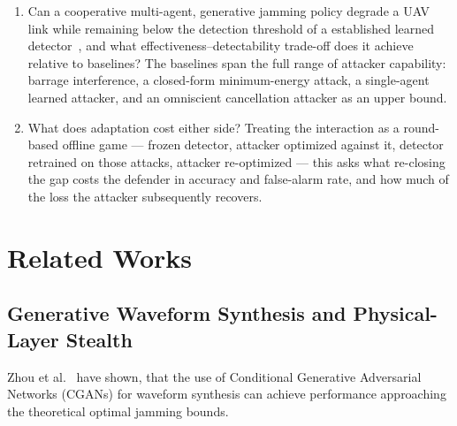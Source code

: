 \documentclass[conference]{IEEEtran}
\newcommand{\adm}[1]{{\color{orange}{[#1]}}}
\newcommand{\rar}[1]{{\color{blue}{[#1]}}}
\begin{document}
\begin{enumerate}
    \item Can a cooperative multi-agent, generative jamming policy degrade a UAV link while remaining below the detection threshold of a established learned detector~\cite{9707819}, and what effectiveness--detectability trade-off does it achieve relative to baselines? 
The baselines span the full range of attacker capability: barrage interference, a closed-form minimum-energy attack, a single-agent learned attacker, and an omniscient cancellation attacker as an upper bound.
    \item What does adaptation cost either side? Treating the interaction as a round-based offline game --- frozen detector, attacker optimized against it, detector retrained on those attacks, attacker re-optimized --- this asks what re-closing the gap costs the defender in accuracy and false-alarm rate, and how much of the loss the attacker subsequently recovers.
\end{enumerate}

\section{Related Works}
\subsection{Generative Waveform Synthesis and Physical-Layer Stealth}
Zhou et al.~\cite{11184988} have shown, that the use of Conditional Generative Adversarial Networks (CGANs) for waveform synthesis can achieve performance approaching the theoretical optimal jamming bounds. \rar{but, no stealth -> is stealth truly necessary? maybe it's redundant since stealth is not realistic?}
\end{document}
